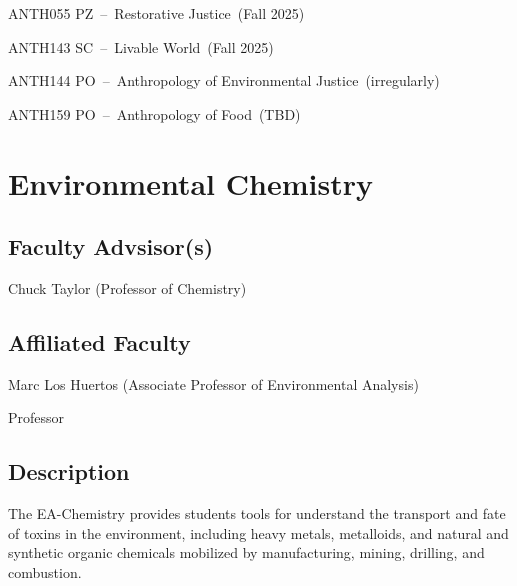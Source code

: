 \documentclass{article}\usepackage[]{graphicx}\usepackage[]{xcolor}
\newenvironment{itemize*}%
  {\begin{itemize}%
    \setlength{\itemsep}{0pt}%
    \setlength{\parskip}{0pt}}%
  {\end{itemize}}
\begin{document}
\begin{description}
\begin{itemize*}
  \item ANTH055 PZ~--~Restorative Justice~(Fall 2025)
  \item ANTH143 SC~--~Livable World~(Fall 2025)
  \item ANTH144 PO~--~Anthropology of Environmental Justice~(irregularly)
  \item ANTH159 PO~--~Anthropology of Food~(TBD)
\end{itemize*}


\end{description}

\newpage %
\section{Environmental Chemistry}



\subsection{Faculty Advsisor(s)}

\begin{itemize*}
  \item Chuck Taylor (Professor of Chemistry)
\end{itemize*}

\subsection{Affiliated Faculty}

\begin{itemize*}
  \item Marc Los Huertos (Associate Professor of Environmental Analysis)
  \item Professor
\end{itemize*}

\subsection{Description}

The EA-Chemistry provides students tools for understand the transport and fate of toxins in the environment, including heavy metals, metalloids, and natural and synthetic organic chemicals mobilized by manufacturing, mining, drilling, and combustion. 
\end{document}
